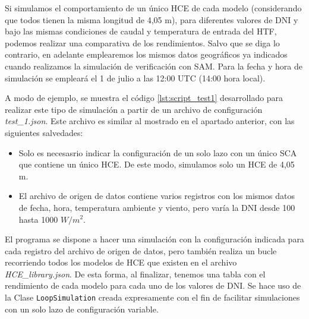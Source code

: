 Si simulamos el comportamiento de un único HCE de cada modelo (considerando que todos tienen la misma longitud de 4,05 m),  para  diferentes valores de DNI y bajo las mismas condiciones de caudal y temperatura de entrada del HTF, podemos realizar una comparativa de los rendimientos. Salvo que se diga lo contrario, en adelante emplearemos los mismos datos geográficos ya indicados cuando realizamos la simulación de verificación con SAM. Para la fecha y hora de simulación se empleará el 1 de julio a las 12:00 UTC (14:00 hora local).

A modo de ejemplo, se muestra el código  \ref{lst:script_test1} desarrollado para realizar este tipo de simulación a partir de un archivo de configuración \emph{test\_1.json}.  Este archivo es similar al mostrado en el apartado anterior, con las siguientes salvedades:
\begin{itemize}
\item
Solo es necesasrio indicar la configuración de un solo lazo con un único SCA que contiene un único HCE. De este modo, simulamos solo un HCE de 4,05 m.
\item 
El archivo de origen de datos contiene varios registros con los mismos datos de fecha, hora, temperatura ambiente y viento, pero varía la DNI desde 100 hasta 1000 $W/m^2$.
\end{itemize}

El programa se dispone a hacer una simulación con la configuración indicada para cada registro del archivo de origen de datos, pero también realiza un bucle recorriendo todos los modelos de HCE que existen en el archivo \emph{HCE\_library.json}. De esta forma, al finalizar, tenemos una tabla con el rendimiento de cada modelo para cada uno de los valores de DNI. Se hace uso de la Clase \texttt{LoopSimulation} creada expresamente con el fin de facilitar simulaciones con un solo lazo de configuración variable.

